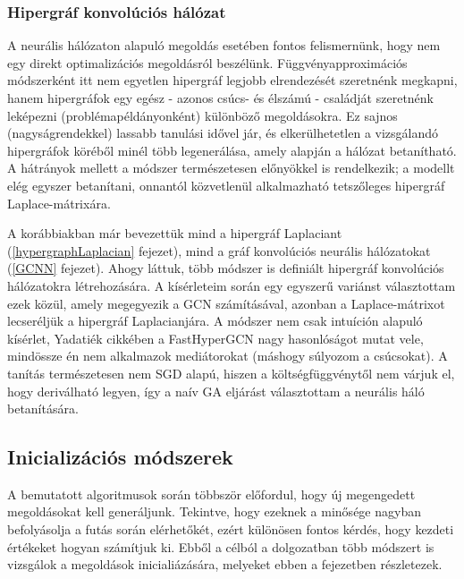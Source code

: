\subsubsection{Hipergráf konvolúciós hálózat}

A neurális hálózaton alapuló megoldás esetében fontos felismernünk, hogy nem egy direkt optimalizációs megoldásról beszélünk. Függvényapproximációs módszerként itt nem egyetlen hipergráf legjobb elrendezését szeretnénk megkapni, hanem hipergráfok egy egész - azonos csúcs- és élszámú - családját szeretnénk leképezni (problémapéldányonként) különböző megoldásokra. Ez  sajnos (nagyságrendekkel) lassabb tanulási idővel jár, és elkerülhetetlen a vizsgálandó hipergráfok köréből minél több legenerálása, amely alapján a hálózat betanítható. A hátrányok mellett a módszer természetesen előnyökkel is rendelkezik; a modellt elég egyszer betanítani, onnantól közvetlenül alkalmazható tetszőleges hipergráf Laplace-mátrixára.


A korábbiakban már bevezettük mind a hipergráf Laplaciant (\ref{hypergraphLaplacian} fejezet), mind a gráf konvolúciós neurális hálózatokat (\ref{GCNN} fejezet). Ahogy láttuk, több módszer is definiált hipergráf konvolúciós hálózatokra létrehozására. A kísérleteim során egy egyszerű variánst választottam ezek közül, amely megegyezik a GCN számításával, azonban a Laplace-mátrixot lecseréljük a hipergráf Laplacianjára. A módszer nem csak intuíción alapuló kísérlet, Yadatiék cikkében\cite{hgcn} a FastHyperGCN nagy hasonlóságot mutat vele, mindössze én nem alkalmazok mediátorokat (máshogy súlyozom a csúcsokat). A tanítás természetesen nem SGD alapú, hiszen a költségfüggvénytől nem várjuk el, hogy deriválható legyen, így a naív GA eljárást választottam a neurális háló betanítására.



\subsection{Inicializációs módszerek}

A bemutatott algoritmusok során többször előfordul, hogy új megengedett megoldásokat kell generáljunk. Tekintve, hogy ezeknek a minősége nagyban befolyásolja a futás során elérhetőkét, ezért különösen fontos kérdés, hogy kezdeti értékeket hogyan számítjuk ki. Ebből a célból a dolgozatban több módszert is vizsgálok a megoldások inicialiázására, melyeket ebben a fejezetben részletezek.

